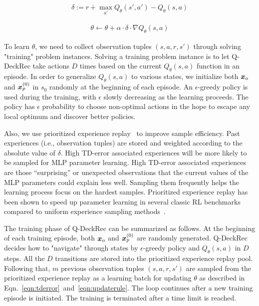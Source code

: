\begin{align}
\delta := r + \max_{a'} Q_{\theta}(s', a') - Q_{\theta}(s,a)
\label{eqn:tderror}
\end{align}

\begin{align}
\theta \leftarrow \theta + \alpha \cdot \delta \cdot \nabla Q_\theta(s,a)
\label{eqn:updaterule}
\end{align}

To learn $\theta$, we need to collect  observation tuples $(s,a,r,s')$ through solving "training" problem instances. Solving a training problem instance is to let Q-DeckRec take actions $D$ times based on the current $Q_\theta(s,a)$ function in an episode. In order to generalize $Q_\theta(s,a)$ to various states, we initialize both $\boldsymbol{x}_o$ and $\boldsymbol{x}_p^{(0)}$ in $s_0$ randomly at the beginning of each episode. An $\epsilon$-greedy policy is used during the training, with $\epsilon$ slowly decreasing as the learning proceeds. The policy has $\epsilon$ probability to choose non-optimal actions in the hope to escape any local optimum and discover better policies. 

Also, we use prioritized experience replay~\citep{schaul2015prioritized} to improve sample efficiency. Past experiences (i.e., observation tuples) are stored and weighted according to the absolute value of $\delta$. High TD-error associated experiences will be more likely to be sampled for MLP parameter learning. High TD-error associated experiences are those ``surprising'' or unexpected observations that the current values of the MLP parameters could explain less well. Sampling them frequently helps the learning process focus on the hardest samples. Prioritized experience replay has been shown to speed up parameter learning in several classic RL benchmarks compared to uniform experience sampling methods~\citep{schaul2015prioritized}.  

The training phase of Q-DeckRec can be summarized as follows. At the beginning of each training episode, both $\boldsymbol{x}_o$ and $\boldsymbol{x}_p^{(0)}$ are randomly generated. Q-DeckRec decides how to "navigate" through states by $\epsilon$-greedy policy and $Q_\theta(s,a)$ in $D$ steps. All the $D$ transitions are stored into the prioritized experience replay pool. Following that, $m$ previous observation tuples $(s, a, r, s')$ are sampled from the prioritized experience replay as a learning batch for updating $\theta$ as described in Eqn.~\ref{eqn:tderror}~and~\ref{eqn:updaterule}. The loop continues after a new training episode is initiated. The training is terminated after a time limit is reached. 


